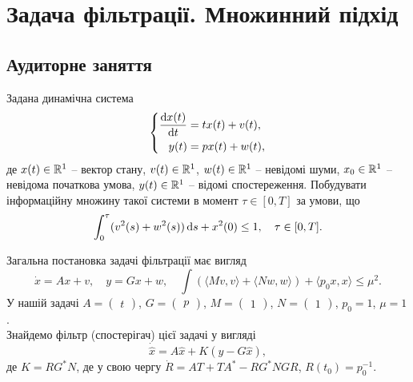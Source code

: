 \section{Задача фільтрації. Множинний підхід}

\subsection*{Аудиторне заняття}

\begin{problem}
	Задана динамічна система \[ \left\{ \begin{aligned}
		\frac{\mathop{}\!\mathrm{d} x(t)}{\mathop{}\!\mathrm{d} t} &= t x(t) + v(t), \\
		y(t) &= p x(t) + w(t),
	\end{aligned} \right. \]
	де $x(t) \in \mathbb{R}^1$ -- вектор стану, $v(t) \in \mathbb{R}^1$, $w(t) \in \mathbb{R}^1$ -- невідомі шуми, $x_0 \in \mathbb{R}^1$ -- невідома початкова умова, $y(t) \in \mathbb{R}^1$ -- відомі спостереження. Побудувати інформаційну множину такої системи в момент $\tau \in [0, T]$ за умови, що \[ \int_0^\tau (v^2(s) + w^2(s)) \mathop{}\!\mathrm{d} s + x^2(0) \le 1, \quad \tau \in [0, T]. \]
\end{problem}

\begin{solution}
	Загальна постановка задачі фільтрації має вигляд \[ \dot x = A x + v, \quad y = G x + w, \quad \int ( \langle Mv, v\rangle + \langle Nw, w\rangle )  + \langle p_0 x, x \rangle \le \mu^2. \] У нашій задачі $A = \begin{pmatrix} t \end{pmatrix}$, $G = \begin{pmatrix} p \end{pmatrix}$, $M = \begin{pmatrix} 1 \end{pmatrix}$, $N = \begin{pmatrix} 1 \end{pmatrix}$, $p_0 = 1$, $\mu = 1$. \\

	Знайдемо фільтр (спостерігач) цієї задачі у вигляді \[ \dot{\hat{x}} = A \hat x + K (y - G \hat x), \] де $K = R G^* N$, де у свою чергу $\dot R = A T + T A^* - R G^* N G R$, $R(t_0) = p_0^{-1}$. \\
\end{solution}

\begin{problem}
\end{problem}

\begin{solution}
\end{solution}

\begin{problem}
\end{problem}

\begin{solution}
\end{solution}
